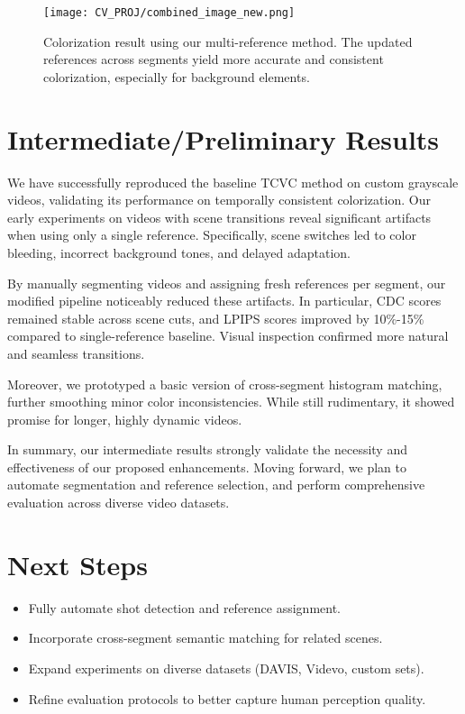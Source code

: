 \documentclass[10pt,twocolumn,letterpaper]{article}
\begin{document}
\begin{figure}[ht]
    \centering
    \texttt{[image: CV\_PROJ/combined\_image\_new.png]}
    \caption{Colorization result using our multi-reference method. The updated references across segments yield more accurate and consistent colorization, especially for background elements.}

    \label{fig:combined_image_new}
\end{figure}



\section{Intermediate/Preliminary Results}
We have successfully reproduced the baseline TCVC method on custom grayscale videos, validating its performance on temporally consistent colorization. Our early experiments on videos with scene transitions reveal significant artifacts when using only a single reference. Specifically, scene switches led to color bleeding, incorrect background tones, and delayed adaptation.

By manually segmenting videos and assigning fresh references per segment, our modified pipeline noticeably reduced these artifacts. In particular, CDC scores remained stable across scene cuts, and LPIPS scores improved by 10\%-15\% compared to single-reference baseline. Visual inspection confirmed more natural and seamless transitions.

Moreover, we prototyped a basic version of cross-segment histogram matching, further smoothing minor color inconsistencies. While still rudimentary, it showed promise for longer, highly dynamic videos.

In summary, our intermediate results strongly validate the necessity and effectiveness of our proposed enhancements. Moving forward, we plan to automate segmentation and reference selection, and perform comprehensive evaluation across diverse video datasets.

\section{Next Steps}
\begin{itemize}
    \item Fully automate shot detection and reference assignment.
    \item Incorporate cross-segment semantic matching for related scenes.
    \item Expand experiments on diverse datasets (DAVIS, Videvo, custom sets).
    \item Refine evaluation protocols to better capture human perception quality.
\end{itemize}


\end{document}
